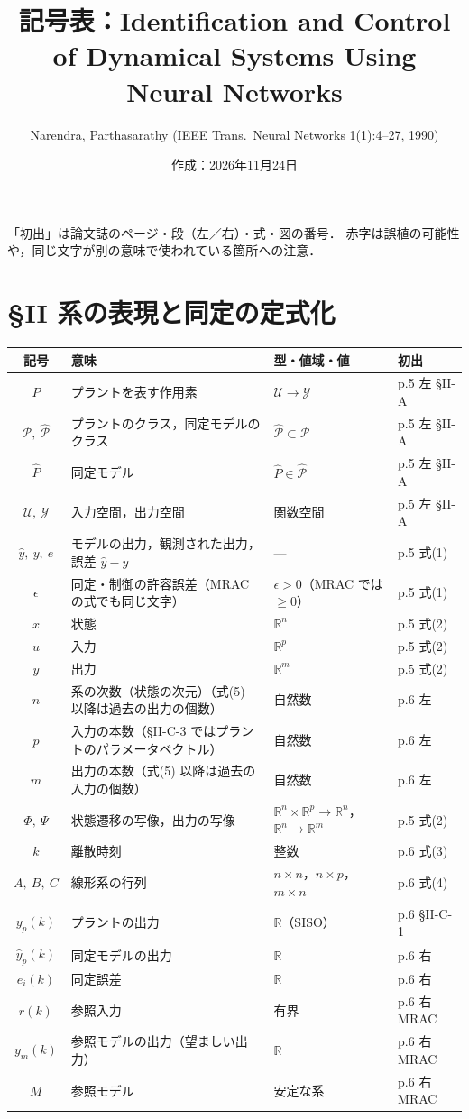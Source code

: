 \documentclass[a4paper,10pt]{ltjsarticle}
\title{記号表：Identification and Control of Dynamical Systems Using Neural Networks}
\author{Narendra, Parthasarathy (IEEE Trans.\ Neural Networks 1(1):4--27, 1990)}
\date{作成：2026年11月24日}
\newcommand{\note}[1]{\textcolor{red!70!black}{#1}}
\newenvironment{symtab}{%
  \par\noindent\begin{tabular}{SMTP}
  \toprule
  記号 & 意味 & 型・値域・値 & 初出 \\
  \midrule
}{\bottomrule\end{tabular}\par\medskip}
\begin{document}
\maketitle

\noindent
「初出」は論文誌のページ・段（左／右）・式・図の番号．
\note{赤字}は誤植の可能性や，同じ文字が別の意味で使われている箇所への注意．

\section{§II 系の表現と同定の定式化}
\begin{symtab}
$P$ & プラントを表す作用素 & $\mathcal{U}\to\mathcal{Y}$ & p.5 左 §II-A \\
$\mathcal{P},\ \hat{\mathcal{P}}$ & プラントのクラス，同定モデルのクラス & $\hat{\mathcal{P}}\subset\mathcal{P}$ & p.5 左 §II-A \\
$\hat P$ & 同定モデル & $\hat P\in\hat{\mathcal{P}}$ & p.5 左 §II-A \\
$\mathcal{U},\ \mathcal{Y}$ & 入力空間，出力空間 & 関数空間 & p.5 左 §II-A \\
$\hat y,\ y,\ e$ & モデルの出力，観測された出力，誤差 $\hat y - y$ & --- & p.5 式(1) \\
$\epsilon$ & 同定・制御の許容誤差\note{（MRAC の式でも同じ文字）} & $\epsilon>0$（MRAC では $\ge 0$） & p.5 式(1) \\
$x$ & 状態 & $\mathbb{R}^n$ & p.5 式(2) \\
$u$ & 入力 & $\mathbb{R}^p$ & p.5 式(2) \\
$y$ & 出力 & $\mathbb{R}^m$ & p.5 式(2) \\
$n$ & 系の次数（状態の次元）\note{（式(5) 以降は過去の出力の個数）} & 自然数 & p.6 左 \\
$p$ & 入力の本数\note{（§II-C-3 ではプラントのパラメータベクトル）} & 自然数 & p.6 左 \\
$m$ & 出力の本数\note{（式(5) 以降は過去の入力の個数）} & 自然数 & p.6 左 \\
$\Phi,\ \Psi$ & 状態遷移の写像，出力の写像 & $\mathbb{R}^n\times\mathbb{R}^p\to\mathbb{R}^n$，$\mathbb{R}^n\to\mathbb{R}^m$ & p.5 式(2) \\
$k$ & 離散時刻 & 整数 & p.6 式(3) \\
$A,\ B,\ C$ & 線形系の行列 & $n\times n$，$n\times p$，$m\times n$ & p.6 式(4) \\
$y_p(k)$ & プラントの出力 & $\mathbb{R}$（SISO） & p.6 §II-C-1 \\
$\hat y_p(k)$ & 同定モデルの出力 & $\mathbb{R}$ & p.6 右 \\
$e_i(k)$ & 同定誤差 & $\mathbb{R}$ & p.6 右 \\
$r(k)$ & 参照入力 & 有界 & p.6 右 MRAC \\
$y_m(k)$ & 参照モデルの出力（望ましい出力） & $\mathbb{R}$ & p.6 右 MRAC \\
$M$ & 参照モデル & 安定な系 & p.6 右 MRAC \\
\end{symtab}
\end{document}
